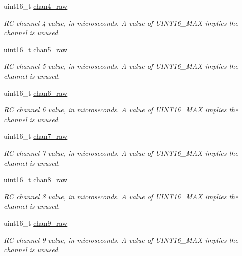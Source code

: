\begin{DoxyCompactItemize}
uint16\+\_\+t \hyperlink{struct____mavlink__rc__channels__t_aa636e5125264bada19518de805eb57ea}{chan4\+\_\+raw}
\begin{DoxyCompactList}\small\item\em R\+C channel 4 value, in microseconds. A value of U\+I\+N\+T16\+\_\+\+M\+A\+X implies the channel is unused. \end{DoxyCompactList}\item 
uint16\+\_\+t \hyperlink{struct____mavlink__rc__channels__t_adaab87a7e10694d4a621f4a7856fe407}{chan5\+\_\+raw}
\begin{DoxyCompactList}\small\item\em R\+C channel 5 value, in microseconds. A value of U\+I\+N\+T16\+\_\+\+M\+A\+X implies the channel is unused. \end{DoxyCompactList}\item 
uint16\+\_\+t \hyperlink{struct____mavlink__rc__channels__t_a13dc783e33d94fd8a3dabe55a011e3b9}{chan6\+\_\+raw}
\begin{DoxyCompactList}\small\item\em R\+C channel 6 value, in microseconds. A value of U\+I\+N\+T16\+\_\+\+M\+A\+X implies the channel is unused. \end{DoxyCompactList}\item 
uint16\+\_\+t \hyperlink{struct____mavlink__rc__channels__t_ae3b8250180999e3730cac28cb63853b4}{chan7\+\_\+raw}
\begin{DoxyCompactList}\small\item\em R\+C channel 7 value, in microseconds. A value of U\+I\+N\+T16\+\_\+\+M\+A\+X implies the channel is unused. \end{DoxyCompactList}\item 
uint16\+\_\+t \hyperlink{struct____mavlink__rc__channels__t_aad00fbc6eac3369961061ca581dd10e3}{chan8\+\_\+raw}
\begin{DoxyCompactList}\small\item\em R\+C channel 8 value, in microseconds. A value of U\+I\+N\+T16\+\_\+\+M\+A\+X implies the channel is unused. \end{DoxyCompactList}\item 
uint16\+\_\+t \hyperlink{struct____mavlink__rc__channels__t_ae57644bb7f8a9e52ecf48fdf845b3d2e}{chan9\+\_\+raw}
\begin{DoxyCompactList}\small\item\em R\+C channel 9 value, in microseconds. A value of U\+I\+N\+T16\+\_\+\+M\+A\+X implies the channel is unused. \end{DoxyCompactList}\item 

\end{DoxyCompactItemize}
